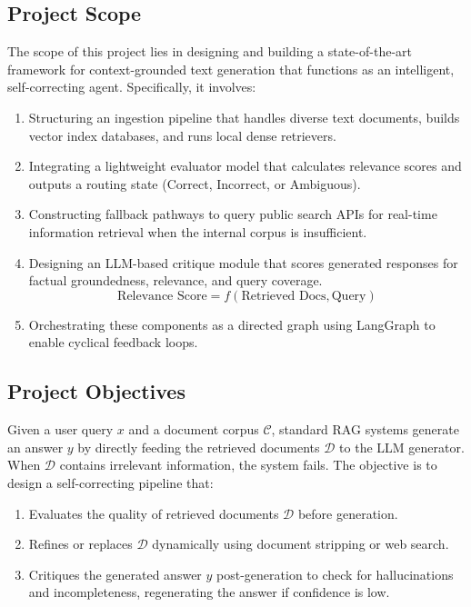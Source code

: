 \documentclass[12pt,a4paper]{article}
\begin{document}
\subsection{Project Scope}
The scope of this project lies in designing and building a state-of-the-art framework for context-grounded text generation that functions as an intelligent, self-correcting agent. Specifically, it involves:
\begin{enumerate}
    \item Structuring an ingestion pipeline that handles diverse text documents, builds vector index databases, and runs local dense retrievers.
    \item Integrating a lightweight evaluator model that calculates relevance scores and outputs a routing state (Correct, Incorrect, or Ambiguous).
    \item Constructing fallback pathways to query public search APIs for real-time information retrieval when the internal corpus is insufficient.
    \item Designing an LLM-based critique module that scores generated responses for factual groundedness, relevance, and query coverage.
    \begin{equation*}
        \text{Relevance Score} = f(\text{Retrieved Docs}, \text{Query})
    \end{equation*}
    \item Orchestrating these components as a directed graph using LangGraph to enable cyclical feedback loops.
\end{enumerate}

\subsection{Project Objectives}
Given a user query $x$ and a document corpus $\mathcal{C}$, standard RAG systems generate an answer $y$ by directly feeding the retrieved documents $\mathcal{D}$ to the LLM generator. When $\mathcal{D}$ contains irrelevant information, the system fails. The objective is to design a self-correcting pipeline that:
\begin{enumerate}
    \item Evaluates the quality of retrieved documents $\mathcal{D}$ before generation.
    \item Refines or replaces $\mathcal{D}$ dynamically using document stripping or web search.
    \item Critiques the generated answer $y$ post-generation to check for hallucinations and incompleteness, regenerating the answer if confidence is low.
\end{enumerate}
\end{document}
